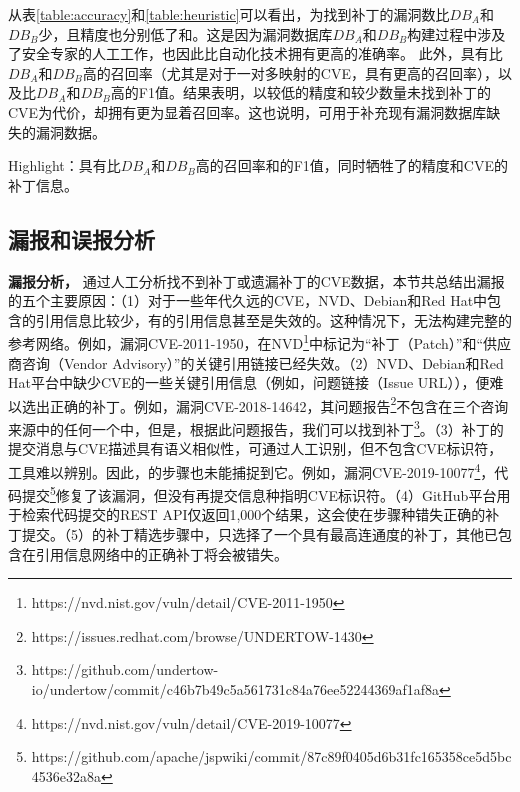 从表\ref{table:accuracy}和\ref{table:heuristic}可以看出，\tool 为找到补丁的漏洞数比$DB_A$和$DB_B$少，且精度也分别低了和。这是因为漏洞数据库$DB_A$和$DB_B$构建过程中涉及了安全专家的人工工作，也因此比自动化技术拥有更高的准确率。
此外，\tool 具有比$DB_A$和$DB_B$高的召回率（尤其是对于一对多映射的CVE，\tool 具有更高的召回率），以及比$DB_A$和$DB_B$高的F1值。结果表明，\tool 以较低的精度和较少数量未找到补丁的CVE为代价，却拥有更为显着召回率。这也说明，\tool 可用于补充现有漏洞数据库缺失的漏洞数据。

\begin{tcolorbox}[size=title,opacityfill=0.15]
Highlight：\tool 具有比$DB_A$和$DB_B$高的召回率和的F1值，同时牺牲了的精度和CVE的补丁信息。
\end{tcolorbox}

\subsection{\tool 漏报和误报分析}

\textbf{漏报分析，}
通过人工分析\tool 找不到补丁或遗漏补丁的CVE数据，本节共总结出\tool 漏报的五个主要原因：（1）对于一些年代久远的CVE，NVD、Debian和Red Hat中包含的引用信息比较少，有的引用信息甚至是失效的。这种情况下，\tool 无法构建完整的参考网络。例如，漏洞CVE-2011-1950，在NVD\footnote{https://nvd.nist.gov/vuln/detail/CVE-2011-1950}中标记为“补丁（Patch）”和“供应商咨询（Vendor Advisory）”的关键引用链接已经失效。（2）NVD、Debian和Red Hat平台中缺少CVE的一些关键引用信息（例如，问题链接（Issue URL）），\tool 便难以选出正确的补丁。例如，漏洞CVE-2018-14642，其问题报告\footnote{https://issues.redhat.com/browse/UNDERTOW-1430}不包含在三个咨询来源中的任何一个中，但是，根据此问题报告，我们可以找到补丁\footnote{https://github.com/undertow-io/undertow/commit/c46b7b49c5a561731c84a76ee52244369af1af8a}。（3）补丁的提交消息与CVE描述具有语义相似性，可通过人工识别，但不包含CVE标识符，工具难以辨别。因此，\tool 的步骤也未能捕捉到它。例如，漏洞CVE-2019-10077\footnote{https://nvd.nist.gov/vuln/detail/CVE-2019-10077}，代码提交\footnote{https://github.com/apache/jspwiki/commit/87c89f0405d6b31fc165358ce5d5bc4536e32a8a}修复了该漏洞，但没有再提交信息种指明CVE标识符。（4）GitHub平台用于检索代码提交的REST API仅返回1,000个结果，这会使\tool 在步骤种错失正确的补丁提交。（5）\tool 的补丁精选步骤中，只选择了一个具有最高连通度的补丁，其他已包含在引用信息网络中的正确补丁将会被\tool 错失。

